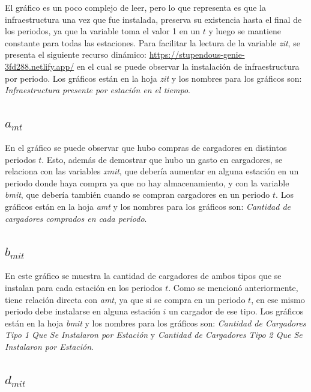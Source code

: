 \documentclass[letterpaper]{article}
\begin{document}
\begin{flushleft}
	El gráfico es un poco complejo de leer, pero lo que representa es que la infraestructura una vez que fue instalada, preserva su existencia hasta el final de los periodos, ya que la variable toma el valor 1 en un $t$ y luego se mantiene constante para todas las estaciones. Para facilitar la lectura de la variable \textit{zit}, se presenta el siguiente recurso dinámico: \url{https://stupendous-genie-3fd288.netlify.app/} en el cual se puede observar la instalación de infraestructura por periodo. Los gráficos están en la hoja \textit{zit} y los nombres para los gráficos son: \textit{Infraestructura presente por estación en el tiempo}.

	\subsection{\texorpdfstring{$a_{mt}$}{amt}} \label{sec:amt}

	En el gráfico se puede observar que hubo compras de cargadores en distintos periodos $t$. Esto, además de demostrar que hubo un gasto en cargadores, se relaciona con las variables \textit{xmit}, que debería aumentar en alguna estación en un periodo donde haya compra ya que no hay almacenamiento, y con la variable \textit{bmit}, que debería también cuando se compran cargadores en un periodo $t$. Los gráficos están en la hoja \textit{amt} y los nombres para los gráficos son: \textit{Cantidad de cargadores comprados en cada periodo}.

	\subsection{\texorpdfstring{$b_{mit}$}{bmit}}

	En este gráfico se muestra la cantidad de cargadores de ambos tipos que se instalan para cada estación en los periodos $t$. Como se mencionó anteriormente, tiene relación directa con \textit{amt}, ya que si se compra en un periodo $t$, en ese mismo periodo debe instalarse en alguna estación $i$ un cargador de ese tipo. Los gráficos están en la hoja \textit{bmit} y los nombres para los gráficos son: \textit{Cantidad de Cargadores Tipo 1 Que Se Instalaron por Estación} y \textit{Cantidad de Cargadores Tipo 2 Que Se Instalaron por Estación}.

	\subsection{\texorpdfstring{$d_{mit}$}{dmit}}


\end{flushleft}
\end{document}

